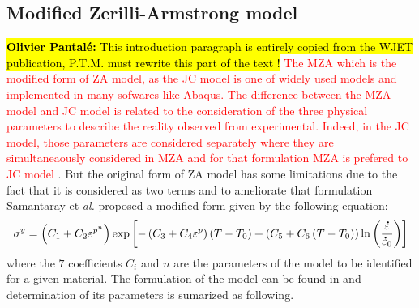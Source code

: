 \documentclass[twoside,english,1p,final,sort&compress]{elsarticle}
\makeatletter
\theoremstyle{plain}
\newcommand{\mdot}[1]{\accentset{\mbox{\bfseries .}}{#1}}
\newcommand*{\eal}{et \emph{al.}\@\xspace}
\DeclareRobustCommand{\OP}[1]{ {\begingroup\sethlcolor{VWyellow}\textcolor{red}{\hl{\textbf{Olivier Pantal\'e:} #1}}\endgroup} }
\makeatother
\begin{document}
\subsection{Modified Zerilli-Armstrong model\label{sec:MZA}}
\OP{This introduction paragraph is entirely copied from the WJET publication, P.T.M. must rewrite this part of the text !}
\textcolor{red}{The MZA which is the modified form of ZA model, as the JC model is one of widely used models and implemented in many sofwares like Abaqus. The difference between the MZA model and JC model is related to the consideration of the three physical parameters to describe the reality observed from experimental. Indeed, in the JC model, those parameters are considered separately where they are simultaneaously considered in MZA and for that formulation MZA is prefered to JC model} \cite{Hull-2011}.
But the original form of ZA model has some limitations due to the fact that it is considered as two terms and to ameliorate that formulation Samantaray \eal \cite{Samantaray-2009} proposed a modified form given by the following equation:
\begin{equation}
\label{eq:MZA-model}
\sigma^y = \left(C_{1}+C_{2}\varepsilon^{p^n}\right) \exp\left[-\left(C_{3}+C_{4}\varepsilon^p\right)\left(T-T_0\right) + \left(C_{5}+C_{6}\left(T-T_0\right)\right)\ln\left( \frac{\mdot\varepsilon}{\mdot{\varepsilon}_0}\right)\right]
\end{equation}
where the $7$ coefficients $C_i$ and $n$ are the parameters of the model to be identified for a given material. The formulation of the model can be found in \cite{Samantaray-2009} and determination of its parameters is sumarized as following.
\end{document}
